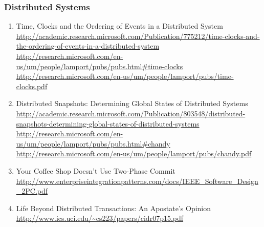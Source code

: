 \documentclass{article}
\begin{document}
\subsubsection{Distributed Systems}
\begin{enumerate}
	\item {Time, Clocks and the Ordering of Events in a Distributed System\\		
\href{http://academic.research.microsoft.com/Publication/775212/time-clocks-and-the-ordering-of-events-in-a-distributed-system}{http://academic.research.microsoft.com/Publication/775212/time-clocks-and-the-ordering-of-events-in-a-distributed-system}\\
\href{http://research.microsoft.com/en-us/um/people/lamport/pubs/pubs.html#time-clocks}{http://research.microsoft.com/en-us/um/people/lamport/pubs/pubs.html\#time-clocks}\\
\href{http://research.microsoft.com/en-us/um/people/lamport/pubs/time-clocks.pdf}{http://research.microsoft.com/en-us/um/people/lamport/pubs/time-clocks.pdf}}
	\item {Distributed Snapshots: Determining Global States of Distributed Systems\\
\href{http://academic.research.microsoft.com/Publication/803548/distributed-snapshots-determining-global-states-of-distributed-systems}{http://academic.research.microsoft.com/Publication/803548/distributed-snapshots-determining-global-states-of-distributed-systems}\\
\href{http://research.microsoft.com/en-us/um/people/lamport/pubs/pubs.html#chandy}{http://research.microsoft.com/en-us/um/people/lamport/pubs/pubs.html\#chandy}\\
\href{http://research.microsoft.com/en-us/um/people/lamport/pubs/chandy.pdf}{http://research.microsoft.com/en-us/um/people/lamport/pubs/chandy.pdf}}
	\item {Your Coffee Shop Doesn’t Use Two-Phase Commit\\
\href{http://www.enterpriseintegrationpatterns.com/docs/IEEE_Software_Design_2PC.pdf}{http://www.enterpriseintegrationpatterns.com/docs/IEEE\_Software\_Design\_2PC.pdf}}
	\item {Life Beyond Distributed Transactions: An Apostate’s Opinion\\
\url{http://www.ics.uci.edu/~cs223/papers/cidr07p15.pdf}}
\end{enumerate}
\end{document}
